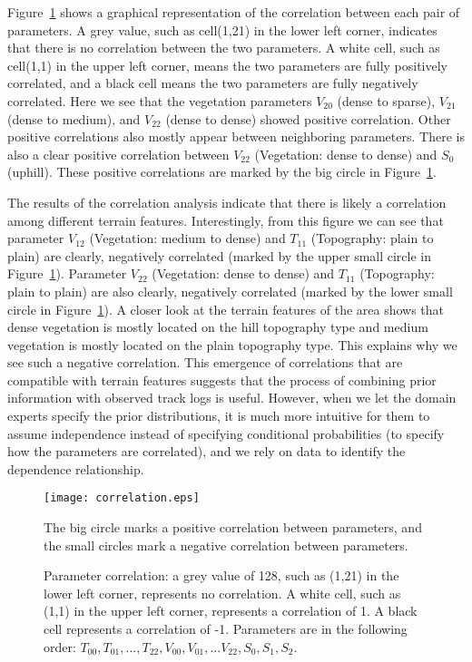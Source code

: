 \documentclass[smallextended,natbib]{svjour3}
\begin{document}
Figure~\ref{correlation} shows a graphical representation of the correlation between each pair of parameters. A grey value, such as cell(1,21) in the lower left corner, indicates that there is no correlation between the two parameters. A white cell, such as cell(1,1) in the upper left corner, means the two parameters are fully positively correlated, and a black cell means the two parameters are fully negatively correlated. Here we see that the vegetation parameters $V_{20}$ (dense to sparse), $V_{21}$ (dense to medium), and $V_{22}$ (dense to dense) showed positive correlation. Other positive correlations also mostly appear between neighboring parameters. There is also a clear positive correlation between $V_{22}$ (Vegetation: dense to dense) and $S_{0}$ (uphill). These positive correlations are marked by the big circle in Figure~\ref{correlation}.

The results of the correlation analysis indicate that there is likely a correlation among different terrain features. Interestingly, from this figure we can see that parameter $V_{12}$ (Vegetation: medium to dense) and $T_{11}$ (Topography: plain to plain) are clearly, negatively correlated (marked by the upper small circle in Figure~\ref{correlation}). Parameter $V_{22}$ (Vegetation: dense to dense) and $T_{11}$ (Topography: plain to plain) are also clearly, negatively correlated (marked by the lower small circle in Figure~\ref{correlation}). A closer look at the terrain features of the area shows that dense vegetation is mostly located on the hill topography type and medium vegetation is mostly located on the plain topography type. This explains why we see such a negative correlation. This emergence of correlations that are compatible with terrain features suggests that the process of combining prior information with observed track logs is useful. However, when we let the domain experts specify the prior distributions, it is much more intuitive for them to assume independence instead of specifying conditional probabilities (to specify how the parameters are correlated), and we rely on data to identify the dependence relationship.
\begin{figure}
\centering
\texttt{[image: correlation.eps]}
\caption[Parameter correlation]{Parameter correlation: a grey value of 128, such as (1,21) in the lower left corner, represents no correlation. A white cell, such as (1,1) in the upper left corner, represents a correlation of 1. A black cell represents a correlation of -1. Parameters are in the following order: $T_{00},T_{01},...,T_{22},V_{00},V_{01},...V_{22},S_{0},S_{1},S_{2}.$} The big circle marks a positive correlation between parameters, and the small circles mark a negative correlation between parameters.
\label{correlation}
\end{figure}
\end{document}
